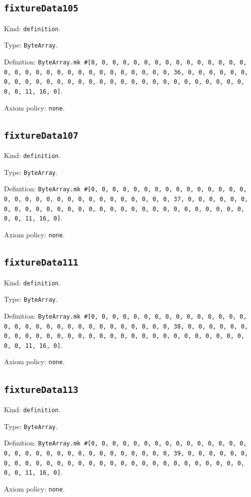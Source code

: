 \documentclass[11pt]{article}
\begin{document}
\subsection*{\texttt{fixtureData105}}
\noindent Kind: \texttt{definition}.\par
\noindent Type: \texttt{ByteArray}.\par
\noindent Definition: \texttt{ByteArray.mk \#[0, 0, 0, 0, 0, 0, 0, 0, 0, 0, 0, 0, 0, 0, 0, 0, 0, 0, 0, 0, 0, 0, 0, 0, 0, 0, 0, 0, 0, 0, 0, 36, 0, 0, 0, 0, 0, 0, 0, 0, 0, 0, 0, 0, 0, 0, 0, 0, 0, 0, 0, 0, 0, 0, 0, 0, 0, 0, 0, 0, 0, 0, 0, 11, 16, 0]}.\par
\noindent Axiom policy: \texttt{none}.\par
\subsection*{\texttt{fixtureData107}}
\noindent Kind: \texttt{definition}.\par
\noindent Type: \texttt{ByteArray}.\par
\noindent Definition: \texttt{ByteArray.mk \#[0, 0, 0, 0, 0, 0, 0, 0, 0, 0, 0, 0, 0, 0, 0, 0, 0, 0, 0, 0, 0, 0, 0, 0, 0, 0, 0, 0, 0, 0, 0, 37, 0, 0, 0, 0, 0, 0, 0, 0, 0, 0, 0, 0, 0, 0, 0, 0, 0, 0, 0, 0, 0, 0, 0, 0, 0, 0, 0, 0, 0, 0, 0, 11, 16, 0]}.\par
\noindent Axiom policy: \texttt{none}.\par
\subsection*{\texttt{fixtureData111}}
\noindent Kind: \texttt{definition}.\par
\noindent Type: \texttt{ByteArray}.\par
\noindent Definition: \texttt{ByteArray.mk \#[0, 0, 0, 0, 0, 0, 0, 0, 0, 0, 0, 0, 0, 0, 0, 0, 0, 0, 0, 0, 0, 0, 0, 0, 0, 0, 0, 0, 0, 0, 0, 38, 0, 0, 0, 0, 0, 0, 0, 0, 0, 0, 0, 0, 0, 0, 0, 0, 0, 0, 0, 0, 0, 0, 0, 0, 0, 0, 0, 0, 0, 0, 0, 11, 16, 0]}.\par
\noindent Axiom policy: \texttt{none}.\par
\subsection*{\texttt{fixtureData113}}
\noindent Kind: \texttt{definition}.\par
\noindent Type: \texttt{ByteArray}.\par
\noindent Definition: \texttt{ByteArray.mk \#[0, 0, 0, 0, 0, 0, 0, 0, 0, 0, 0, 0, 0, 0, 0, 0, 0, 0, 0, 0, 0, 0, 0, 0, 0, 0, 0, 0, 0, 0, 0, 39, 0, 0, 0, 0, 0, 0, 0, 0, 0, 0, 0, 0, 0, 0, 0, 0, 0, 0, 0, 0, 0, 0, 0, 0, 0, 0, 0, 0, 0, 0, 0, 11, 16, 0]}.\par
\noindent Axiom policy: \texttt{none}.\par
\end{document}
